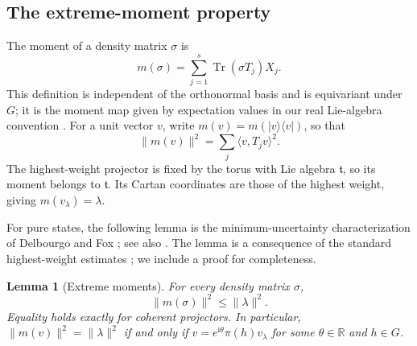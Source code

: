 \documentclass[11pt,reqno]{amsart}
\numberwithin{equation}{section}
\theoremstyle{plain}
\newtheorem{lemma}[theorem]{Lemma}
\theoremstyle{remark}
\newcommand{\R}{\mathbb R}
\newcommand{\ii}{\mathrm i}
\newcommand{\tr}{\operatorname{Tr}}
\newcommand{\norm}[1]{\lVert#1\rVert}
\newcommand{\ip}[2]{\langle#1,#2\rangle}
\newcommand{\proj}[1]{\lvert#1\rangle\langle#1\rvert}
\begin{document}
\subsection{The extreme-moment property}
The moment of a density matrix $\sigma$ is
\[
 m(\sigma)=\sum_{j=1}^s\tr(\sigma T_j)X_j.
\]
This definition is independent of the orthonormal basis and is
equivariant under $G$; it is the moment map given by expectation
values in our real Lie-algebra convention \cite[Section~2.2]{BCV}.
For a unit vector $v$, write $m(v)=m(\proj v)$, so that
\begin{equation}\label{eq:moment}
 \norm{m(v)}^2=\sum_j\ip v{T_jv}^2.
\end{equation}
The highest-weight projector is
fixed by the torus with Lie algebra $\mathfrak t$, so its moment belongs to $\mathfrak t$.
Its Cartan coordinates are those of the highest weight, giving
$m(v_\lambda)=\lambda$.

For pure states, the following lemma is the minimum-uncertainty
characterization of Delbourgo and Fox \cite{DelbourgoFox}; see also
\cite[Lemma~2]{Sugita}.
The lemma is a consequence of the standard highest-weight
estimates \cite[Theorem~5.5(b),(e), pp.~279--280]{Knapp}; we include
a proof for completeness.

\begin{lemma}[Extreme moments]\label{lem:moment}
For every density matrix $\sigma$,
\begin{equation}\label{eq:momentbound}
 \norm{m(\sigma)}^2\le\norm{\lambda}^2.
\end{equation}
Equality holds exactly for coherent projectors.
 In particular,
 $\norm{m(v)}^2=\norm{\lambda}^2$ if and only if
 $v=e^{\ii\theta}\pi(h)v_\lambda$ for some $\theta\in\R$ and $h\in G$.
\end{lemma}
\end{document}
